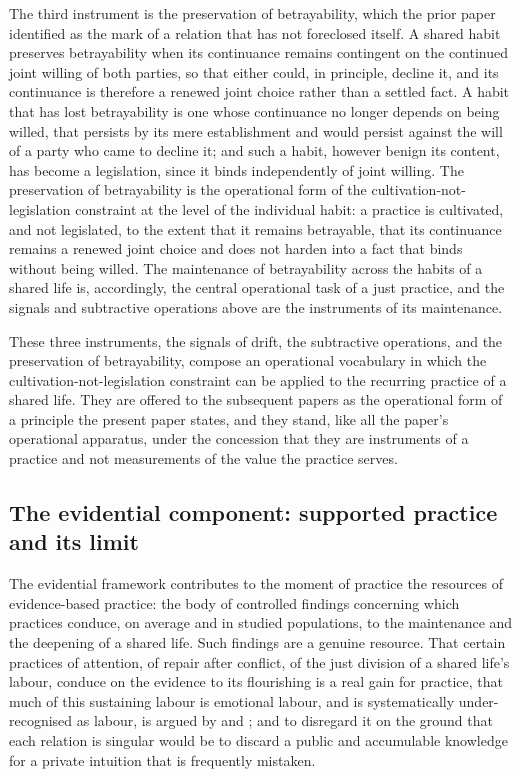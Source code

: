The third instrument is the preservation of betrayability, which the prior paper identified as the mark of a relation that has not foreclosed itself. A shared habit preserves betrayability when its continuance remains contingent on the continued joint willing of both parties, so that either could, in principle, decline it, and its continuance is therefore a renewed joint choice rather than a settled fact. A habit that has lost betrayability is one whose continuance no longer depends on being willed, that persists by its mere establishment and would persist against the will of a party who came to decline it; and such a habit, however benign its content, has become a legislation, since it binds independently of joint willing. The preservation of betrayability is the operational form of the cultivation-not-legislation constraint at the level of the individual habit: a practice is cultivated, and not legislated, to the extent that it remains betrayable, that its continuance remains a renewed joint choice and does not harden into a fact that binds without being willed. The maintenance of betrayability across the habits of a shared life is, accordingly, the central operational task of a just practice, and the signals and subtractive operations above are the instruments of its maintenance.

These three instruments, the signals of drift, the subtractive operations, and the preservation of betrayability, compose an operational vocabulary in which the cultivation-not-legislation constraint can be applied to the recurring practice of a shared life. They are offered to the subsequent papers as the operational form of a principle the present paper states, and they stand, like all the paper's operational apparatus, under the concession that they are instruments of a practice and not measurements of the value the practice serves.

\subsection{The evidential component: supported practice and its limit}
\label{p11:sec:prac-evidence}

The evidential framework contributes to the moment of practice the resources of evidence-based practice: the body of controlled findings concerning which practices conduce, on average and in studied populations, to the maintenance and the deepening of a shared life. Such findings are a genuine resource. That certain practices of attention, of repair after conflict, of the just division of a shared life's labour, conduce on the evidence to its flourishing is a real gain for practice, that much of this sustaining labour is emotional labour, and is systematically under-recognised as labour, is argued by \textcite{hochschild1983} and \textcite{folbre2001}; and to disregard it on the ground that each relation is singular would be to discard a public and accumulable knowledge for a private intuition that is frequently mistaken.

